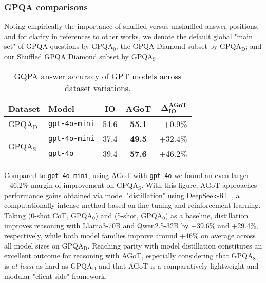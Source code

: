 \documentclass{article}
\begin{document}
\subsubsection{GPQA comparisons} \label{subsubsec:gpqa-comparisons}
Noting empirically the importance of shuffled versus unshuffled answer positions, and for clarity in references to other works, we denote the default global "main set" of GPQA questions by GPQA$_\text{0}$; the GPQA Diamond subset by GPQA$_\text{D}$; and our Shuffled GPQA Diamond subset by GPQA$_\text{S}$.

\begin{table}[h!]
    \centering
    \begin{tabular}{l|lccr}
        \toprule
        \textbf{Dataset} & \textbf{Model} & \textbf{IO} & \textbf{AGoT} & $\mathbf{\Delta^\text{AGoT}_\text{IO}}$ \\
        \midrule
        GPQA$_\text{D}$ & \texttt{gpt-4o-mini} & 54.6 & \textbf{55.1} & +0.9\% \\
        \midrule
        \multirow{2}{*}{GPQA$_\text{S}$}
         & \texttt{gpt-4o-mini} & 37.4 & \textbf{49.5} & +32.4\% \\
         & \texttt{gpt-4o} & 39.4 & \textbf{57.6} & +46.2\% \\
        \bottomrule
    \end{tabular}
    \caption{GQPA answer accuracy of GPT models across dataset variations.}
    \label{tab:gpt-gpqa-results}
\end{table}

Compared to \texttt{gpt-4o-mini}, using AGoT with \texttt{gpt-4o} we found an even larger +46.2\% margin of improvement on GPQA$_\text{S}$. With this figure, AGoT approaches performance gains obtained via model "distillation" using DeepSeek-R1~\citep{deepseekai2025deepseekr1incentivizingreasoningcapability}, a computationally intense method based on fine-tuning and reinforcement learning. Taking \citet{dubey2024llama} (0-shot CoT, GPQA$_\text{0}$) and \citet{yang2024qwen2} (5-shot, GPQA$_\text{0}$) as a baseline, distillation improves reasoning with Llama3-70B and Qwen2.5-32B by +39.6\% and +29.4\%, respectively, while both model families improve around +46\% on average across all model sizes on GPQA$_\text{D}$. Reaching parity with model distillation constitutes an excellent outcome for reasoning with AGoT, especially considering that GPQA$_\text{S}$ is \textit{at least} as hard as GPQA$_\text{D}$ and that AGoT is a comparatively lightweight and modular "client-side" framework.
\end{document}
